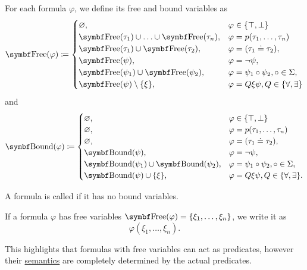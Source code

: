 \begin{definition}
  For each formula \( \varphi \), we define its free and bound variables as
  \begin{align*}
    \Bold{Free}(\varphi) \coloneqq \begin{cases}
      \varnothing,                                             &\varphi \in \{ \top, \bot \} \\
      \Bold{Free}(\tau_1) \cup \ldots \cup \Bold{Free}(\tau_n), &\varphi = p(\tau_1, \ldots, \tau_n) \\
      \Bold{Free}(\tau_1) \cup \Bold{Free}(\tau_2),             &\varphi = (\tau_1 \doteq \tau_2), \\
      \Bold{Free}(\psi),                                        &\varphi = \neg \psi, \\
      \Bold{Free}(\psi_1) \cup \Bold{Free}(\psi_2),             &\varphi = \psi_1 \circ \psi_2, \circ \in \Sigma, \\
      \Bold{Free}(\psi) \setminus \{ \xi \},                    &\varphi = Q \xi \psi, Q \in \{ \forall, \exists \}
    \end{cases}
  \end{align*}
  and
  \begin{align*}
    \Cat{Bound}(\varphi) \coloneqq \begin{cases}
      \varnothing,                                             &\varphi \in \{ \top, \bot \} \\
      \varnothing,                                             &\varphi = p(\tau_1, \ldots, \tau_n) \\
      \varnothing,                                             &\varphi = (\tau_1 \doteq \tau_2), \\
      \Cat{Bound}(\psi),                                       &\varphi = \neg \psi, \\
      \Cat{Bound}(\psi_1) \cup \Bold{Bound}(\psi_2),           &\varphi = \psi_1 \circ \psi_2, \circ \in \Sigma, \\
      \Cat{Bound}(\psi) \cup \{ \xi \},                        &\varphi = Q \xi \psi, Q \in \{ \forall, \exists \}.
    \end{cases}
  \end{align*}

  A formula is called  if it has no bound variables.

  If a formula \( \varphi \) has free variables \( \Bold{Free}(\varphi) = \{ \xi_1, \ldots, \xi_n \} \), we write it as
  \begin{equation*}
    \varphi(\xi_1, \ldots, \xi_n).
  \end{equation*}

  This highlights that formulas with free variables can act as predicates, however their \hyperref[def:first_order_model]{semantics} are completely determined by the actual predicates.
\end{definition}

